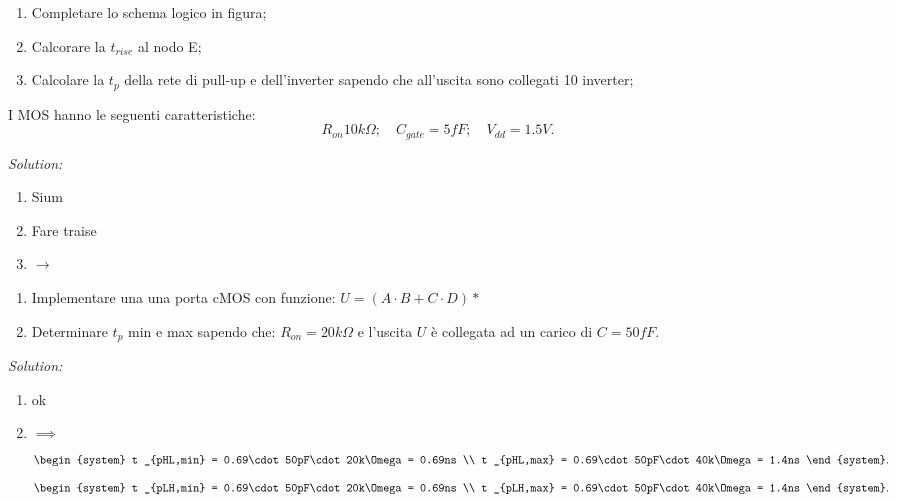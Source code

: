 \documentclass[12pt]{article}
\begin{document}
\begin{problem}{}{}
    \begin{enumerate}
        \item Completare lo schema logico in figura;
        \item Calcorare la $t_{rise}$ al nodo E;
        \item Calcolare la $t_p$ della rete di pull-up e dell'inverter sapendo che all'uscita sono collegati 10 inverter;
    \end{enumerate}
    I MOS hanno le seguenti caratteristiche:
    \[ R _{on} 10k\Omega;\quad C _{gate} = 5fF;\quad V _{dd} = 1.5V .\]
    
    \emph{Solution:}
    \begin{enumerate}
        \item Sium
        \item Fare traise
        \item $\to$
    \end{enumerate}
\end{problem}

\begin{problem}{}{}
    \begin{enumerate}
        \item Implementare una una porta cMOS con funzione: $U = (A\cdot B + C\cdot D)*$
        \item Determinare $t_p$ min e max sapendo che: $R _{on} = 20k\Omega$ e l'uscita $U$ \`e collegata ad un carico di $C=50fF$.
    \end{enumerate}
    
    \emph{Solution:}
    \begin{enumerate}
        \item  ok
        \item $ \implies $
            \[ \begin{system} 
                t _{pHL,min} = 0.69\cdot 50pF\cdot 20k\Omega = 0.69ns \\
                t _{pHL,max} = 0.69\cdot 50pF\cdot 40k\Omega = 1.4ns
            \end{system}  .\]
            \[ \begin{system} 
                t _{pLH,min} = 0.69\cdot 50pF\cdot 20k\Omega = 0.69ns \\
                t _{pLH,max} = 0.69\cdot 50pF\cdot 40k\Omega = 1.4ns
            \end{system}  .\]
    \end{enumerate}
\end{problem}
\end{document}
